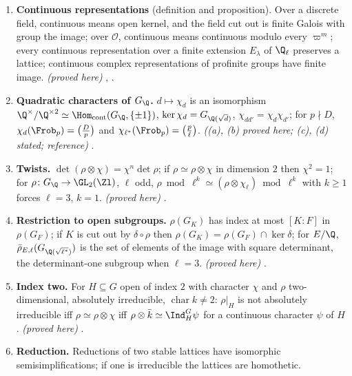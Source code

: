 \begin{enumerate}[label=\textbf{\thechapter.\arabic*}]
irreducible. Every nontrivial element of finite order of $G_\Q$ is a complex conjugation. \emph{(proved here, except the last statement, stated;
reference)} .
\item \textbf{Continuous representations} (definition and proposition). Over a discrete field, continuous means open kernel, and the field cut out is
finite Galois with group the image; over $\mathcal{O}$, continuous means continuous modulo every $\varpi^m$; every continuous representation over a
finite extension $E_\lambda$ of $\Q_\ell$ preserves a lattice; continuous complex representations of profinite groups have finite image.
\emph{(proved here)} , .
\item \textbf{Quadratic characters of $G_\Q$.} $d\mapsto\chi_d$ is an isomorphism $\Q^\times/\Q^{\times2}\simeq\Hom_{\mathrm{cont}}(G_\Q,\{\pm1\})$, $\ker\chi_d=
G_{\Q(\sqrt d)}$, $\chi_{dd'}=\chi_d\chi_{d'}$; for $p\nmid D$, $\chi_d(\Frob_p)=\bigl(\frac Dp\bigr)$ and $\chi_{\ell^*}(\Frob_p)=\bigl(\frac p\ell\bigr)$.
\emph{((a), (b) proved here; (c), (d) stated; reference)} .
\item \textbf{Twists.} $\det(\rho\otimes\chi)=\chi^n\det\rho$; if $\rho\simeq\rho\otimes\chi$ in dimension $2$ then $\chi^2=1$; for
$\rho\colon G_\Q\to\GL_2(\Zl)$, $\ell$ odd, $\rho\bmod\ell^k\simeq(\rho\otimes\chi_\ell)\bmod\ell^k$ with $k\ge1$ forces $\ell=3$, $k=1$.
\emph{(proved here)} .
\item \textbf{Restriction to open subgroups.} $\rho(G_K)$ has index at most $[K:F]$ in $\rho(G_F)$; if $K$ is cut out by $\delta\circ\rho$ then
$\rho(G_K)=\rho(G_F)\cap\ker\delta$; for $E/\Q$, $\bar\rho_{E,\ell}(G_{\Q(\sqrt{\ell^*})})$ is the set of elements of the image with square determinant, the
determinant-one subgroup when $\ell=3$. \emph{(proved here)} .
\item \textbf{Index two.} For $H\subseteq G$ open of index $2$ with character $\chi$ and $\rho$ two-dimensional, absolutely irreducible, $\operatorname{char}k\ne2$:
$\rho|_H$ is not absolutely irreducible iff $\rho\simeq\rho\otimes\chi$ iff $\rho\otimes\bar k\simeq\Ind_H^G\psi$ for a continuous character $\psi$ of $H$.
\emph{(proved here)} .
\item \textbf{Reduction.} Reductions of two stable lattices have isomorphic semisimplifications; if one is irreducible the lattices are homothetic.

\end{enumerate}
